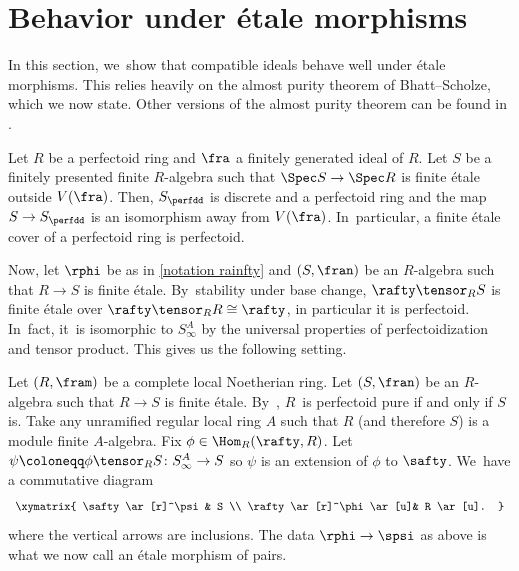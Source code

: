 \section{Behavior under étale morphisms}\label{section behavior étale morphisms}

In this section, we~show that compatible ideals behave well under étale morphisms. This relies heavily on the almost purity theorem of Bhatt--Scholze, which we now state. Other versions of the almost purity theorem can be found in \cite{FaltingsAlmostEtaleExtensions,ScholzePerfectoidSpaces,KedlayaLiuRelativeHodgeTheory,AndreLemmeAbhyankarPerfectoide}.

\begin{theorem}
Let $R$ be a perfectoid ring and $\fra$ a finitely generated ideal of $R$. Let $S$ be a finitely presented finite $R$\nobreakdash-algebra such that $\Spec S\to \Spec R$ is finite étale outside $V(\fra)$. Then, $S_{\perfdd}$ is discrete and a perfectoid ring and the map $S\to S_{\perfdd}$ is an isomorphism away from $V(\fra)$. In~particular, a finite étale cover of a perfectoid ring is perfectoid.
\end{theorem}

Now, let $\rphi$ be as in \autoref{notation rainfty} and $(S,\fran)$ be an $R$\nobreakdash-algebra such that $R\to S$ is finite étale. By~stability under base change, $\rafty \tensor_{R} S $ is finite étale over $\rafty \tensor_{R} R \cong \rafty$, in particular it is perfectoid. In~fact, it~is isomorphic to $S^A_\infty$ by the universal properties of perfectoidization and tensor product. This gives us the following setting.

\begin{setting}\label{setting étale morphism}
Let $(R,\fram)$ be a complete local Noetherian ring. Let $(S,\fran)$ be an $R$\nobreakdash-algebra such that $R\to S$ is finite étale. By~\cite[Lem.\,4.6, Lem.\,4.15]{BMPSTWWPerfectoidPure}, $R$~is perfectoid pure if and only if $S$ is. Take any unramified regular local ring $A$ such that $R$ (and therefore $S$) is a module finite $A$-algebra.
Fix $\phi\in \Hom_R(\rafty,R)$.
Let $\psi\coloneqq \phi \tensor_{R} S\colon S^A_\infty\to S$ so $\psi$ is an extension of $\phi$ to $\safty$. We~have a commutative diagram
\begin{equation}\label{comm diag extension of pairs}
\begin{array}{c}
\xymatrix{
\safty \ar[r]^\psi & S \\
\rafty\ar[r]^\phi \ar[u]& R \ar[u].
}
\end{array}
\end{equation}
where the vertical arrows are inclusions. The data $\rphi\to \spsi$ as above is what we now call an étale morphism of pairs.
\end{setting}

